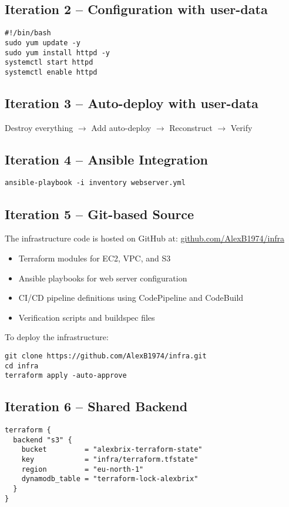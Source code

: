 \documentclass{article}
\begin{document}
\subsection{Iteration 2 – Configuration with user-data}
\begin{verbatim}
#!/bin/bash
sudo yum update -y
sudo yum install httpd -y
systemctl start httpd
systemctl enable httpd
\end{verbatim}

\subsection{Iteration 3 – Auto-deploy with user-data}
Destroy everything $\rightarrow$ Add auto-deploy $\rightarrow$ Reconstruct $\rightarrow$ Verify

\subsection{Iteration 4 – Ansible Integration}
\begin{verbatim}
ansible-playbook -i inventory webserver.yml
\end{verbatim}

\subsection{Iteration 5 – Git-based Source}
The infrastructure code is hosted on GitHub at: \href{https://github.com/AlexB1974/infra}{github.com/AlexB1974/infra}

\begin{itemize}
  \item Terraform modules for EC2, VPC, and S3
  \item Ansible playbooks for web server configuration
  \item CI/CD pipeline definitions using CodePipeline and CodeBuild
  \item Verification scripts and buildspec files
\end{itemize}

To deploy the infrastructure:
\begin{verbatim}
git clone https://github.com/AlexB1974/infra.git
cd infra
terraform apply -auto-approve
\end{verbatim}

\subsection{Iteration 6 – Shared Backend}
\begin{verbatim}
terraform {
  backend "s3" {
    bucket         = "alexbrix-terraform-state"
    key            = "infra/terraform.tfstate"
    region         = "eu-north-1"
    dynamodb_table = "terraform-lock-alexbrix"
  }
}
\end{verbatim}
\end{document}
